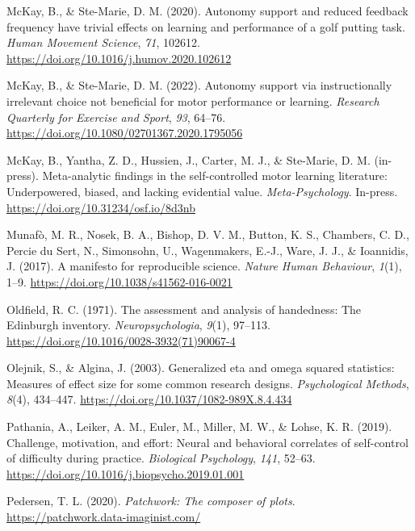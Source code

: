 \documentclass[
  man, donotrepeattitle,floatsintext]{apa7}
\newlength{\cslhangindent}
\newlength{\cslentryspacingunit} %
\newenvironment{CSLReferences}[2] %
 {%
  \setlength{\parindent}{0pt}
  \ifodd #1
  \let\oldpar\par
  \def\par{\hangindent=\cslhangindent\oldpar}
  \fi
  \setlength{\parskip}{#2\cslentryspacingunit}
 }%
 {}
\begin{document}
\begin{CSLReferences}{1}{0}
\leavevmode{}%
McKay, B., \& Ste-Marie, D. M. (2020). Autonomy support and reduced feedback frequency have trivial effects on learning and performance of a golf putting task. \emph{Human Movement Science}, \emph{71}, 102612. \url{https://doi.org/10.1016/j.humov.2020.102612}

\leavevmode{}%
McKay, B., \& Ste-Marie, D. M. (2022). Autonomy support via instructionally irrelevant choice not beneficial for motor performance or learning. \emph{Research Quarterly for Exercise and Sport}, \emph{93}, 64--76. \url{https://doi.org/10.1080/02701367.2020.1795056}

\leavevmode{}%
McKay, B., Yantha, Z. D., Hussien, J., Carter, M. J., \& Ste-Marie, D. M. (in-press). Meta-analytic findings in the self-controlled motor learning literature: {Underpowered}, biased, and lacking evidential value. \emph{Meta-Psychology}. In-press. \url{https://doi.org/10.31234/osf.io/8d3nb}

\leavevmode{}%
Munafò, M. R., Nosek, B. A., Bishop, D. V. M., Button, K. S., Chambers, C. D., Percie du Sert, N., Simonsohn, U., Wagenmakers, E.-J., Ware, J. J., \& Ioannidis, J. (2017). A manifesto for reproducible science. \emph{Nature Human Behaviour}, \emph{1}(1), 1--9. \url{https://doi.org/10.1038/s41562-016-0021}

\leavevmode{}%
Oldfield, R. C. (1971). The assessment and analysis of handedness: The {Edinburgh} inventory. \emph{Neuropsychologia}, \emph{9}(1), 97--113. \url{https://doi.org/10.1016/0028-3932(71)90067-4}

\leavevmode{}%
Olejnik, S., \& Algina, J. (2003). Generalized eta and omega squared statistics: Measures of effect size for some common research designs. \emph{Psychological Methods}, \emph{8}(4), 434--447. \url{https://doi.org/10.1037/1082-989X.8.4.434}

\leavevmode{}%
Pathania, A., Leiker, A. M., Euler, M., Miller, M. W., \& Lohse, K. R. (2019). Challenge, motivation, and effort: {Neural} and behavioral correlates of self-control of difficulty during practice. \emph{Biological Psychology}, \emph{141}, 52--63. \url{https://doi.org/10.1016/j.biopsycho.2019.01.001}

\leavevmode{}%
Pedersen, T. L. (2020). \emph{Patchwork: The composer of plots}. \url{https://patchwork.data-imaginist.com/}


\end{CSLReferences}
\end{document}
